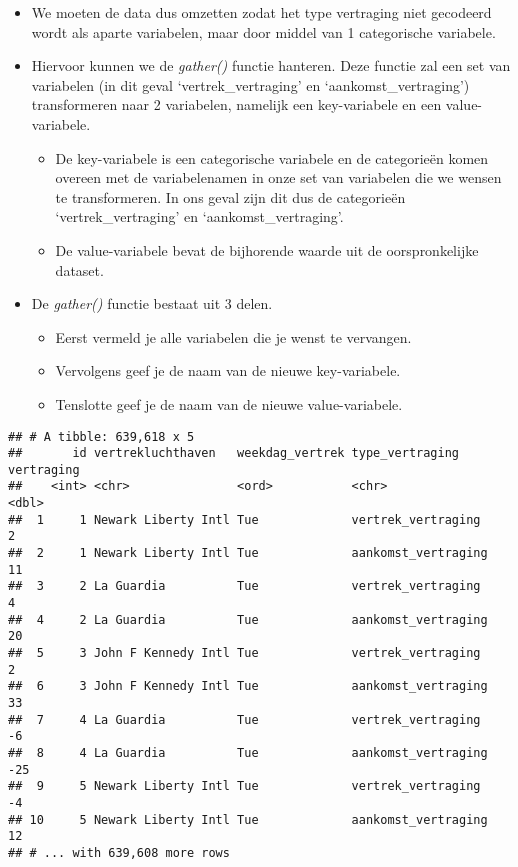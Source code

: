 \documentclass[]{memoir}
\providecommand{\tightlist}{%
  \setlength{\itemsep}{0pt}\setlength{\parskip}{0pt}}
\begin{document}
\begin{itemize}
\tightlist
\item
  We moeten de data dus omzetten zodat het type vertraging niet gecodeerd wordt als aparte variabelen, maar door middel van 1 categorische variabele.
\item
  Hiervoor kunnen we de \emph{gather()} functie hanteren. Deze functie zal een set van variabelen (in dit geval `vertrek\_vertraging' en `aankomst\_vertraging') transformeren naar 2 variabelen, namelijk een key-variabele en een value-variabele.

  \begin{itemize}
  \tightlist
  \item
    De key-variabele is een categorische variabele en de categorieën komen overeen met de variabelenamen in onze set van variabelen die we wensen te transformeren. In ons geval zijn dit dus de categorieën `vertrek\_vertraging' en `aankomst\_vertraging'.
  \item
    De value-variabele bevat de bijhorende waarde uit de oorspronkelijke dataset.
  \end{itemize}
\item
  De \emph{gather()} functie bestaat uit 3 delen.

  \begin{itemize}
  \tightlist
  \item
    Eerst vermeld je alle variabelen die je wenst te vervangen.
  \item
    Vervolgens geef je de naam van de nieuwe key-variabele.
  \item
    Tenslotte geef je de naam van de nieuwe value-variabele.
  \end{itemize}
\end{itemize}

\begin{verbatim}
## # A tibble: 639,618 x 5
##       id vertrekluchthaven   weekdag_vertrek type_vertraging     vertraging
##    <int> <chr>               <ord>           <chr>                    <dbl>
##  1     1 Newark Liberty Intl Tue             vertrek_vertraging           2
##  2     1 Newark Liberty Intl Tue             aankomst_vertraging         11
##  3     2 La Guardia          Tue             vertrek_vertraging           4
##  4     2 La Guardia          Tue             aankomst_vertraging         20
##  5     3 John F Kennedy Intl Tue             vertrek_vertraging           2
##  6     3 John F Kennedy Intl Tue             aankomst_vertraging         33
##  7     4 La Guardia          Tue             vertrek_vertraging          -6
##  8     4 La Guardia          Tue             aankomst_vertraging        -25
##  9     5 Newark Liberty Intl Tue             vertrek_vertraging          -4
## 10     5 Newark Liberty Intl Tue             aankomst_vertraging         12
## # ... with 639,608 more rows
\end{verbatim}
\end{document}

